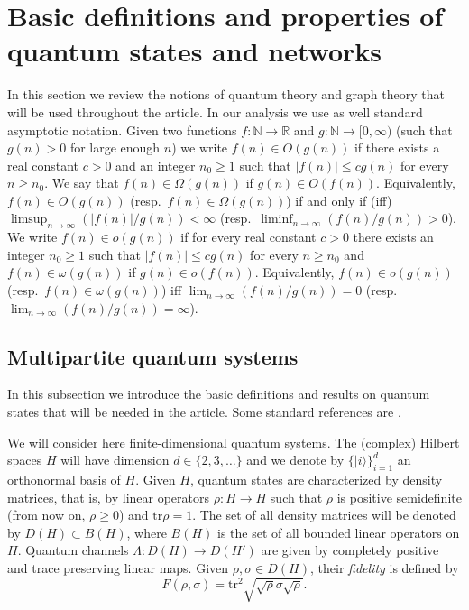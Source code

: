 \documentclass[a4paper,onecolumn,accepted=2024-12-14]{quantumarticle}
\theoremstyle{plain}
\def\tr{\mathrm{tr}}
\begin{document}
\section{Basic definitions and properties of quantum states and networks}\label{sec2}

In this section we review the notions of quantum theory and graph theory that will be used throughout the article. In our analysis we use as well standard asymptotic notation. Given two functions $f\colon\mathbb N\rightarrow\mathbb{R}$ and $g\colon\mathbb N\rightarrow[0,\infty)$ (such that $g(n)>0$ for large enough $n$) we write $f(n)\in O(g(n))$ if there exists a real constant $c>0$ and an integer $n_0\geq 1$ such that $|f(n)|\leq cg(n)$ for every $n\geq n_0$. We say that $f(n)\in \Omega(g(n))$ if $g(n)\in O(f(n))$. Equivalently, $f(n)\in O(g(n))$ (resp.\ $f(n)\in \Omega(g(n))$) if and only if (iff) $\limsup_{n\to\infty}(|f(n)|/g(n))<\infty$ (resp.\ $\liminf_{n\to\infty}(f(n)/g(n))>0$).
We write $f(n)\in o(g(n))$ if for every real constant $c>0$ there exists an integer $n_0\geq 1$ such that $|f(n)|\leq cg(n)$ for every $n\geq n_0$ and $f(n)\in \omega(g(n))$ if $g(n)\in o(f(n))$. Equivalently, $f(n)\in o(g(n))$ (resp.\ $f(n)\in \omega(g(n))$) iff $\lim_{n\to\infty}(f(n)/g(n))=0$ (resp.\ $\lim_{n\to\infty}(f(n)/g(n))=\infty$).

\subsection{Multipartite quantum systems}\label{sec21}

In this subsection we introduce the basic definitions and results on quantum states that will be needed in the article. Some standard references are \cite{Nielsen,Watrous}.

We will consider here finite-dimensional quantum systems. The (complex) Hilbert spaces $H$ will have dimension $d\in\{2,3,\dots \}$ and we denote by
$\{|i\rangle\}_{i=1}^d$ an orthonormal basis of $H$. Given $H$, quantum states are characterized by density matrices, that is, by linear operators $\rho\colon H\to H$ such that $\rho$ is positive semidefinite (from now on, $\rho\geq 0$) and $\tr\rho=1$.
The set of all density matrices will be denoted by $D(H)\subset B(H)$, where $B(H)$ is the set of all bounded linear operators on $H$. Quantum channels $\Lambda\colon D(H)\to D(H')$ are given by completely positive and trace preserving linear maps. Given $\rho,\sigma\in D(H)$, their \textit{fidelity} is defined by
\begin{equation}\label{fidelity}
F(\rho,\sigma)=\tr^2\sqrt{\sqrt{\rho}\sigma\sqrt{\rho}}.
\end{equation}
\end{document}
